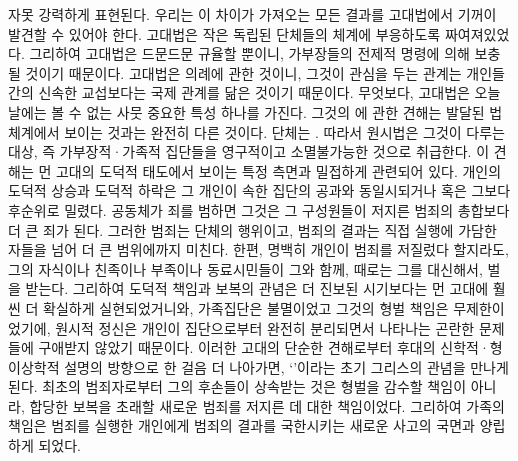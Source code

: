 자못 강력하게 표현된다.
우리는 이 차이가 가져오는 모든 결과를 고대법에서 기꺼이 발견할 수 있어야 한다.
고대법은 작은 독립된 단체들의 체계에 부응하도록 짜여져있었다.
그리하여 고대법은 드문드문 규율할 뿐이니,
가부장들의 전제적 명령에 의해 보충될 것이기 때문이다.
고대법은 의례에 관한 것이니,
그것이 관심을 두는 관계는
개인들 간의 신속한 교섭보다는
국제 관계를 닮은 것이기 때문이다.
무엇보다, 고대법은 오늘날에는 볼 수 없는 사뭇 중요한 특성 하나를 가진다.
그것의 에 관한 견해는
발달된 법체계에서 보이는 것과는 완전히 다른 것이다.
단체는 .
따라서 원시법은 그것이 다루는 대상, 즉 가부장적·가족적 집단들을
영구적이고 소멸불가능한 것으로 취급한다.
이 견해는 먼 고대의 도덕적 태도에서 보이는 특정 측면과 밀접하게 관련되어 있다.
개인의 도덕적 상승과 도덕적 하락은 그 개인이 속한 집단의 공과와
동일시되거나 혹은 그보다 후순위로 밀렸다.
공동체가 죄를 범하면
그것은 그 구성원들이 저지른 범죄의 총합보다 더 큰 죄가 된다.
그러한 범죄는 단체의 행위이고,
범죄의 결과는 직접 실행에 가담한 자들을 넘어 더 큰 범위에까지 미친다.
한편, 명백히 개인이 범죄를 저질렀다 할지라도,
그의 자식이나 친족이나 부족이나 동료시민들이 그와 함께,
때로는 그를 대신해서, 벌을 받는다.
그리하여 도덕적 책임과 보복의 관념은
더 진보된 시기보다는 먼 고대에 훨씬 더 확실하게 실현되었거니와,
가족집단은 불멸이었고 그것의 형벌 책임은 무제한이었기에,
원시적 정신은 개인이 집단으로부터 완전히 분리되면서 나타나는 곤란한 문제들에
구애받지 않았기 때문이다.
이러한 고대의 단순한 견해로부터 후대의 신학적·형이상학적 설명의 방향으로
한 걸음 더 나아가면,
`'이라는 초기 그리스의 관념을 만나게 된다.
최초의 범죄자로부터 그의 후손들이 상속받는 것은
형벌을 감수할 책임이 아니라,
합당한 보복을 초래할
새로운 범죄를 저지른 데 대한 책임이었다.
그리하여 가족의 책임은
범죄를 실행한 개인에게 범죄의 결과를 국한시키는 새로운 사고의 국면과
양립하게 되었다.

